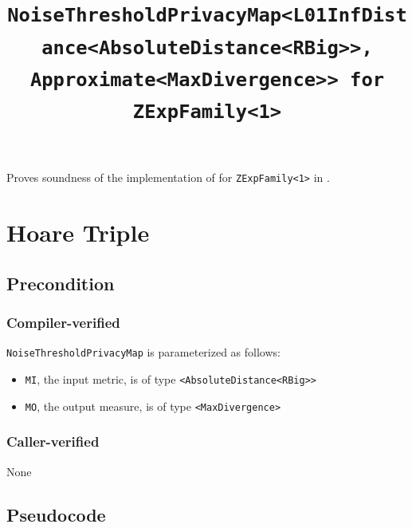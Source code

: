 \documentclass{article}
\title{\texttt{NoiseThresholdPrivacyMap<L01InfDistance<AbsoluteDistance<RBig>>, Approximate<MaxDivergence>> for ZExpFamily<1>}}
\author{\MichaelShoemateAuthor}
\date{}
\begin{document}
\maketitle

\contrib
Proves soundness of the implementation of  for \texttt{ZExpFamily<1>} in .

\section{Hoare Triple}
\subsection*{Precondition}
\subsubsection*{Compiler-verified}
\texttt{NoiseThresholdPrivacyMap} is parameterized as follows:
\begin{itemize}
    \item \texttt{MI}, the input metric, is of type \texttt{<AbsoluteDistance<RBig>>}
    \item \texttt{MO}, the output measure, is of type \texttt{<MaxDivergence>}
\end{itemize}

\subsubsection*{Caller-verified}
None

\subsection*{Pseudocode}

\end{document}
